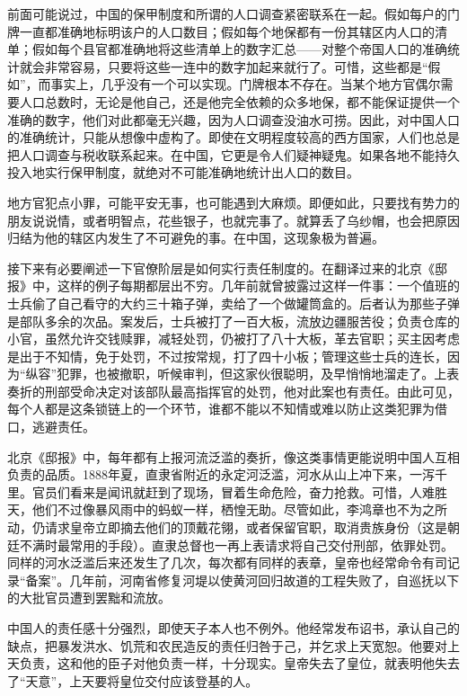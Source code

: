 \documentclass[12pt,oneside]{book}
\begin{document}
\begin{common-format}
前面可能说过，中国的保甲制度和所谓的人口调查紧密联系在一起。假如每户的门牌一直都准确地标明该户的人口数目；假如每个地保都有一份其辖区内人口的清单；假如每个县官都准确地将这些清单上的数字汇总——对整个帝国人口的准确统计就会非常容易，只要将这些一连中的数字加起来就行了。可惜，这些都是“假如”，而事实上，几乎没有一个可以实现。门牌根本不存在。当某个地方官偶尔需要人口总数时，无论是他自己，还是他完全依赖的众多地保，都不能保证提供一个准确的数字，他们对此都毫无兴趣，因为人口调查没油水可捞。因此，对中国人口的准确统计，只能从想像中虚构了。即使在文明程度较高的西方国家，人们也总是把人口调查与税收联系起来。在中国，它更是令人们疑神疑鬼。如果各地不能持久投入地实行保甲制度，就绝对不可能准确地统计出人口的数目。 

地方官犯点小罪，可能平安无事，也可能遇到大麻烦。即便如此，只要找有势力的朋友说说情，或者明智点，花些银子，也就完事了。就算丢了乌纱帽，也会把原因归结为他的辖区内发生了不可避免的事。在中国，这现象极为普遍。 

接下来有必要阐述一下官僚阶层是如何实行责任制度的。在翻译过来的北京《邸报》中，这样的例子每期都层出不穷。几年前就曾披露过这样一件事：一个值班的士兵偷了自己看守的大约三十箱子弹，卖给了一个做罐筒盒的。后者认为那些子弹是部队多余的次品。案发后，士兵被打了一百大板，流放边疆服苦役；负责仓库的小官，虽然允许交钱赎罪，减轻处罚，仍被打了八十大板，革去官职；买主因考虑是出于不知情，免于处罚，不过按常规，打了四十小板；管理这些士兵的连长，因为“纵容”犯罪，也被撤职，听候审判，但这家伙很聪明，及早悄悄地溜走了。上表奏折的刑部受命决定对该部队最高指挥官的处罚，他对此案也有责任。由此可见，每个人都是这条锁链上的一个环节，谁都不能以不知情或难以防止这类犯罪为借口，逃避责任。 

北京《邸报》中，每年都有上报河流泛滥的奏折，像这类事情更能说明中国人互相负责的品质。1888年夏，直隶省附近的永定河泛滥，河水从山上冲下来，一泻千里。官员们看来是闻讯就赶到了现场，冒着生命危险，奋力抢救。可惜，人难胜天，他们不过像暴风雨中的蚂蚁一样，栖惶无助。尽管如此，李鸿章也不为之所动，仍请求皇帝立即摘去他们的顶戴花翎，或者保留官职，取消贵族身份（这是朝廷不满时最常用的手段）。直隶总督也一再上表请求将自己交付刑部，依罪处罚。同样的河水泛滥后来还发生了几次，每次都有同样的表章，皇帝也经常命令有司记录“备案”。几年前，河南省修复河堤以使黄河回归故道的工程失败了，自巡抚以下的大批官员遭到罢黜和流放。 

中国人的责任感十分强烈，即使天子本人也不例外。他经常发布诏书，承认自己的缺点，把暴发洪水、饥荒和农民造反的责任归咎于己，并乞求上天宽恕。他要对上天负责，这和他的臣子对他负责一样，十分现实。皇帝失去了皇位，就表明他失去了“天意”，上天要将皇位交付应该登基的人。 


\end{common-format}
\end{document}
